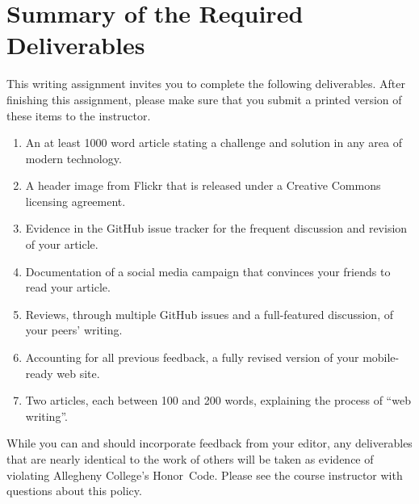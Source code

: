 \section*{Summary of the Required Deliverables}

This writing assignment invites you to complete the following deliverables. After finishing this assignment, please make
sure that you submit a printed version of these items to the instructor.

\vspace*{-.1in}
\begin{enumerate}
  \setlength{\itemsep}{-.01in}

  \item An at least 1000 word article stating a challenge and solution in any area of modern technology.
  \item A header image from Flickr that is released under a Creative Commons licensing agreement.
  \item Evidence in the GitHub issue tracker for the frequent discussion and revision of your article.
  \item Documentation of a social media campaign that convinces your friends to read your article.
  \item Reviews, through multiple GitHub issues and a full-featured discussion, of your peers' writing.
  \item Accounting for all previous feedback, a fully revised version of your mobile-ready web site.
  \item Two articles, each between 100 and 200 words, explaining the process of ``web writing''.
\end{enumerate}
\vspace*{-.1in}


While you can and should incorporate feedback from your editor, any deliverables that are nearly identical to the work
of others will be taken as evidence of violating Allegheny College's \mbox{Honor Code}. Please see the course instructor
with questions about this policy.


